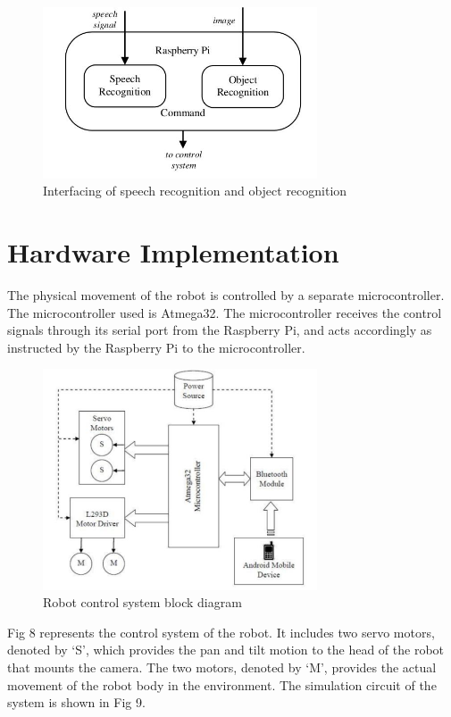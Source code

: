 \documentclass[journal,twoside]{IEEEtran}
\begin{document}
\begin{figure}[H]
\centering
\includegraphics[width=3.2in]{figure7}
\caption{Interfacing of speech recognition and object recognition}
\label{fig:figure7}
\end{figure}

\section{Hardware Implementation}
The physical movement of the robot is controlled by a
separate microcontroller. The microcontroller used is
Atmega32. The microcontroller receives the control signals
through its serial port from the Raspberry Pi, and acts
accordingly as instructed by the Raspberry Pi to the
microcontroller.

\begin{figure}[htbp]
\centering
\includegraphics[width=3.2in]{figure8}
\caption{Robot control system block diagram}
\label{fig:figure8}
\end{figure}

Fig 8 represents the control system of the robot. It includes
two servo motors, denoted by ‘S’, which provides the pan and
tilt motion to the head of the robot that mounts the camera.
The two motors, denoted by ‘M’, provides the actual
movement of the robot body in the environment. The
simulation circuit of the system is shown in Fig 9.
\end{document}
